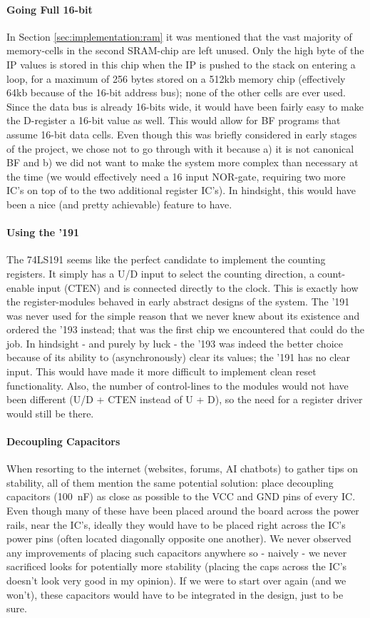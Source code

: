 \paragraph{Going Full 16-bit} In Section \ref{sec:implementation:ram} it was mentioned that the vast majority of memory-cells in the second SRAM-chip are left unused. Only the high byte of the IP values is stored in this chip when the IP is pushed to the stack on entering a loop, for a maximum of 256 bytes stored on a 512kb memory chip (effectively 64kb because of the 16-bit address bus); none of the other cells are ever used. Since the data bus is already 16-bits wide, it would have been fairly easy to make the D-register a 16-bit value as well. This would allow for BF programs that assume 16-bit data cells. Even though this was briefly considered in early stages of the project, we chose not to go through with it because a) it is not canonical BF and b) we did not want to make the system more complex than necessary at the time (we would effectively need a 16 input NOR-gate, requiring two more IC's on top of to the two additional register IC's). In hindsight, this would have been a nice (and pretty achievable) feature to have.

\paragraph{Using the '191} The 74LS191 seems like the perfect candidate to implement the counting registers. It simply has a U/D input to select the counting direction, a count-enable input (CTEN) and is connected directly to the clock. This is exactly how the register-modules behaved in early abstract designs of the system. The '191 was never used for the simple reason that we never knew about its existence and ordered the '193 instead; that was the first chip we encountered that could do the job. In hindsight - and purely by luck - the '193 was indeed the better choice because of its ability to (asynchronously) clear its values; the '191 has no clear input. This would have made it more difficult to implement clean reset functionality. Also, the number of control-lines to the modules would not have been different (U/D + CTEN instead of U + D), so the need for a register driver would still be there.

\paragraph{Decoupling Capacitors} When resorting to the internet (websites, forums, AI chatbots) to gather tips on stability, all of them mention the same potential solution: place decoupling capacitors (100~nF) as close as possible to the VCC and GND pins of every IC. Even though many of these have been placed around the board across the power rails, near the IC's, ideally they would have to be placed right across the IC's power pins (often located diagonally opposite one another). We never observed any improvements of placing such capacitors anywhere so - naively - we never sacrificed looks for potentially more stability (placing the caps across the IC's doesn't look very good in my opinion). If we were to start over again (and we won't), these capacitors would have to be integrated in the design, just to be sure.

